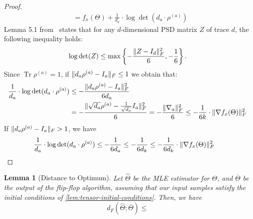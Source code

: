 \documentclass{article}
\newtheorem{lemma}[theorem]{Lemma}
\DeclarePairedDelimiter{\norm}{\lVert}{\rVert}
\newcommand{\otheta}{\overline{\Theta}}
\newcommand{\htheta}{\hat{\Theta}}
\newcommand\tr{\operatorname{Tr}}
\begin{document}
\begin{proof}
\begin{align*}
		&= f_x(\Theta) + \frac{1}{d_a} \cdot  \log\det(d_a \cdot \rho^{(a)})
	\end{align*}
	Lemma 5.1 from~\cite{GGOW19} states that for any $d$-dimensional PSD matrix $Z$ of trace $d$, the following inequality holds:
	$$ \log\det(Z) \leq \max\left\{- \dfrac{\norm{Z - I_d}_F^2}{6}, - \dfrac{1}{6} \right\}. $$
	Since $\tr \rho^{(a)} = 1$, if $\norm{d_a \rho^{(a)} - I_a}_F \leq 1$ we obtain that:
	\begin{align*}
		\frac{1}{d_a} \cdot  \log\det(d_a \cdot \rho^{(a)}) &\leq - \dfrac{\norm{d_a \rho^{(a)} - I_a}_F^2}{6 d_a} \\
		&= - \dfrac{\norm{\sqrt{d_a} \rho^{(a)} - \frac{1}{\sqrt{d_a}} I_a}_F^2}{6} = - \dfrac{\norm{\nabla_a}_F^2}{6} \leq - \dfrac{1}{6k} \cdot \norm{\nabla f_x(\Theta)}_F^2
	\end{align*}
	If $\norm{d_a \rho^{(a)} - I_a}_F > 1$, we have
	\begin{align*}
		\frac{1}{d_a} \cdot  \log\det(d_a \cdot \rho^{(a)}) &\leq - \dfrac{1}{6 d_a} \leq - \dfrac{1}{6 d_k} \leq - \dfrac{1}{6d_k} \cdot \norm{\nabla f_x(\Theta)}_F^2
	\end{align*}
\end{proof}

\begin{lemma}[Distance to Optimum]\label{lem:tensor-distance-opt}
	Let $\htheta$ be the MLE estimator for $\Theta$, and $\otheta$ be the output of the flip-flop algorithm, assuming that our input samples satisfy the initial conditions of \cref{lem:tensor-initial-conditions}. Then, we have
	$$ d_F(\htheta; \otheta) \leq  $$
\end{lemma}
\end{document}
